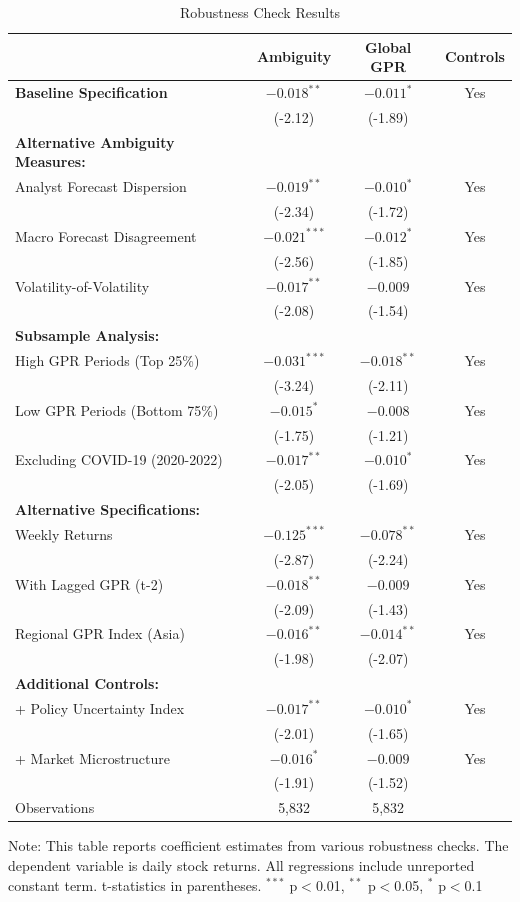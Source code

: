 \documentclass[12pt]{article}
\begin{document}
\begin{table}[htbp]
\centering
\caption{Robustness Check Results}
\label{tab:robustness_results}
\begin{tabular}{lccc}
\toprule
 & Ambiguity & Global GPR & Controls \\
\midrule
\textbf{Baseline Specification} & $-0.018^{**}$ & $-0.011^{*}$ & Yes \\
 & (-2.12) & (-1.89) & \\
\midrule
\textbf{Alternative Ambiguity Measures:} & & & \\
\quad Analyst Forecast Dispersion & $-0.019^{**}$ & $-0.010^{*}$ & Yes \\
 & (-2.34) & (-1.72) & \\
\quad Macro Forecast Disagreement & $-0.021^{***}$ & $-0.012^{*}$ & Yes \\
 & (-2.56) & (-1.85) & \\
\quad Volatility-of-Volatility & $-0.017^{**}$ & $-0.009$ & Yes \\
 & (-2.08) & (-1.54) & \\
\midrule
\textbf{Subsample Analysis:} & & & \\
\quad High GPR Periods (Top 25\%) & $-0.031^{***}$ & $-0.018^{**}$ & Yes \\
 & (-3.24) & (-2.11) & \\
\quad Low GPR Periods (Bottom 75\%) & $-0.015^{*}$ & $-0.008$ & Yes \\
 & (-1.75) & (-1.21) & \\
\quad Excluding COVID-19 (2020-2022) & $-0.017^{**}$ & $-0.010^{*}$ & Yes \\
 & (-2.05) & (-1.69) & \\
\midrule
\textbf{Alternative Specifications:} & & & \\
\quad Weekly Returns & $-0.125^{***}$ & $-0.078^{**}$ & Yes \\
 & (-2.87) & (-2.24) & \\
\quad With Lagged GPR (t-2) & $-0.018^{**}$ & $-0.009$ & Yes \\
 & (-2.09) & (-1.43) & \\
\quad Regional GPR Index (Asia) & $-0.016^{**}$ & $-0.014^{**}$ & Yes \\
 & (-1.98) & (-2.07) & \\
\midrule
\textbf{Additional Controls:} & & & \\
\quad + Policy Uncertainty Index & $-0.017^{**}$ & $-0.010^{*}$ & Yes \\
 & (-2.01) & (-1.65) & \\
\quad + Market Microstructure & $-0.016^{*}$ & $-0.009$ & Yes \\
 & (-1.91) & (-1.52) & \\
\midrule
Observations & 5,832 & 5,832 &  \\
\bottomrule
\end{tabular}
\footnotesize
Note: This table reports coefficient estimates from various robustness checks. The dependent variable is daily stock returns. All regressions include unreported constant term. t-statistics in parentheses. $^{***}$ p$<$0.01, $^{**}$ p$<$0.05, $^{*}$ p$<$0.1
\end{table}
\end{document}

